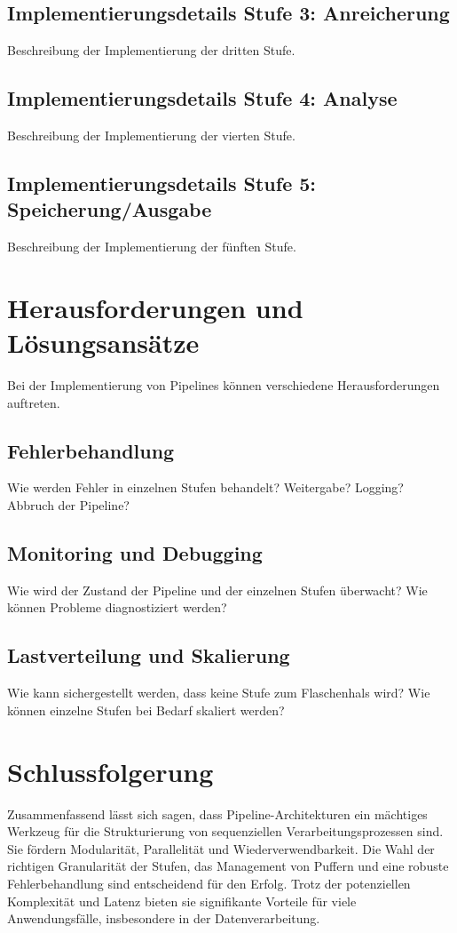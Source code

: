 \documentclass[a4paper]{article} %
\begin{document}
\subsection{Implementierungsdetails Stufe 3: Anreicherung}
Beschreibung der Implementierung der dritten Stufe.
\blindtext[2]
\lipsum[13-14]

\subsection{Implementierungsdetails Stufe 4: Analyse}
Beschreibung der Implementierung der vierten Stufe.
\blindtext[2]
\lipsum[15-16]

\subsection{Implementierungsdetails Stufe 5: Speicherung/Ausgabe}
Beschreibung der Implementierung der fünften Stufe.
\blindtext[2]
\lipsum[17-18]


\section{Herausforderungen und Lösungsansätze}
Bei der Implementierung von Pipelines können verschiedene Herausforderungen auftreten.
\subsection{Fehlerbehandlung}
Wie werden Fehler in einzelnen Stufen behandelt? Weitergabe? Logging? Abbruch der Pipeline?
\lipsum[19-21]

\subsection{Monitoring und Debugging}
Wie wird der Zustand der Pipeline und der einzelnen Stufen überwacht? Wie können Probleme diagnostiziert werden?
\blindtext[3]
\lipsum[22]

\subsection{Lastverteilung und Skalierung}
Wie kann sichergestellt werden, dass keine Stufe zum Flaschenhals wird? Wie können einzelne Stufen bei Bedarf skaliert werden?
\lipsum[23-25]
\blindtext[2]


\section{Schlussfolgerung}
Zusammenfassend lässt sich sagen, dass Pipeline-Architekturen ein mächtiges Werkzeug für die Strukturierung von sequenziellen Verarbeitungsprozessen sind. Sie fördern Modularität, Parallelität und Wiederverwendbarkeit. Die Wahl der richtigen Granularität der Stufen, das Management von Puffern und eine robuste Fehlerbehandlung sind entscheidend für den Erfolg. Trotz der potenziellen Komplexität und Latenz bieten sie signifikante Vorteile für viele Anwendungsfälle, insbesondere in der Datenverarbeitung.
\lipsum[26-28]
\blindtext
\end{document}
